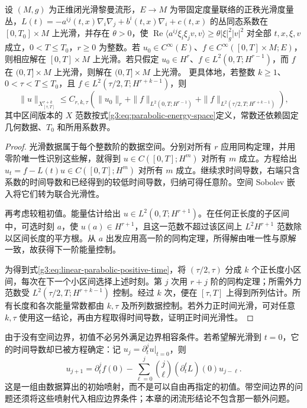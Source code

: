 \begin{theorem}\label{g3:thm:linear-parabolic-smoothing}
	设 \((M,g)\) 为正维闭光滑黎曼流形，\(E\to M\) 为带固定度量联络的正秩光滑度量丛，\(L(t)=-a^{ij}(t,x)\nabla_i\nabla_j+b^i(t,x)\nabla_i+c(t,x)\) 的丛同态系数在 \([0,T_0]\times M\) 上光滑，并存在 \(\theta>0\)，使 \(\operatorname{Re}\langle a^{ij}\xi_i\xi_jv,v\rangle\ge\theta|\xi|_g^2|v|^2\) 对全部 \(t,x,\xi,v\) 成立，\(0<T\le T_0\)，\(r\ge0\) 为整数。若 \(u_0\in C^\infty(E)\)、\(f\in C^\infty([0,T]\times M;E)\)，则相应解在 \([0,T]\times M\) 上光滑。若只假定 \(u_0\in H^r\)、\(f\in L^2(0,T;H^{r-1})\)，而 \(f\) 在 \((0,T]\times M\) 上光滑，则解在 \((0,T]\times M\) 上光滑。
	更具体地，若整数 \(k\ge1\)、\(0<\tau<T\le T_0\)，且 \(f\in L^2(\tau/2,T;H^{r+k-1})\)，则
	\begin{equation}\label{g3:eq:linear-parabolic-positive-time}
		\|u\|_{X^{r+k}_{[\tau,T]}}
		\le C_{r,k,\tau}\left(
		\|u_0\|_r+\|f\|_{L^2(0,T;H^{r-1})}
		+\|f\|_{L^2(\tau/2,T;H^{r+k-1})}\right),
	\end{equation}
	其中区间版本的 \(X\) 范数按式\eqref{g3:eq:parabolic-energy-space}定义，常数还依赖固定几何数据、\(T_0\) 和所用系数界。
\end{theorem}
\begin{proof}
	光滑数据属于每个整数阶的数据空间。分别对所有 \(r\) 应用同构定理，并用零阶唯一性识别这些解，就得到 \(u\in C([0,T];H^m)\) 对所有 \(m\) 成立。方程给出 \(u_t=f-L(t)u\in C([0,T];H^m)\) 对所有 \(m\) 成立。继续求时间导数，右端只含系数的时间导数和已经得到的较低时间导数，归纳可得任意阶。空间 Sobolev 嵌入将它们转为联合光滑性。

	再考虑较粗初值。能量估计给出 \(u\in L^2(0,T;H^{r+1})\)。在任何正长度的子区间中，可选时刻 \(a\)，使 \(u(a)\in H^{r+1}\)，且这一范数不超过该区间上 \(L^2H^{r+1}\) 范数除以区间长度的平方根。从 \(a\) 出发应用高一阶的同构定理，所得解由唯一性与原解一致，故获得下一阶能量控制。

	为得到式\eqref{g3:eq:linear-parabolic-positive-time}，将 \((\tau/2,\tau)\) 分成 \(k\) 个正长度小区间，每次在下一个小区间选择上述时刻。第 \(j\) 次用 \(r+j\) 阶的同构定理；所需外力范数受 \(L^2(\tau/2,T;H^{r+k-1})\) 控制。经过 \(k\) 次，便在 \([\tau,T]\) 上得到所列估计。所有长度和各次能量常数都由 \(k,\tau\) 及所列数据控制。若外力正时间光滑，可对任意 \(k,\tau\) 使用这一结论，再由方程取得时间导数，证明正时间光滑性。
\end{proof}

由于没有空间边界，初值不必另外满足边界相容条件。若希望解光滑到 \(t=0\)，它的时间导数却已被方程确定：记 \(u_j=\partial_t^ju|_{t=0}\)，则
\begin{equation}\label{g3:eq:parabolic-initial-jets}
	 u_{j+1}=\partial_t^jf(0)
	-\sum_{\ell=0}^j\binom j\ell(\partial_t^\ell L)(0)u_{j-\ell}.
\end{equation}
这是一组由数据算出的初始喷射，而不是可以自由再指定的初值。带空间边界的问题还须将这些喷射代入相应边界条件；本章的闭流形结论不包含那一额外问题。

